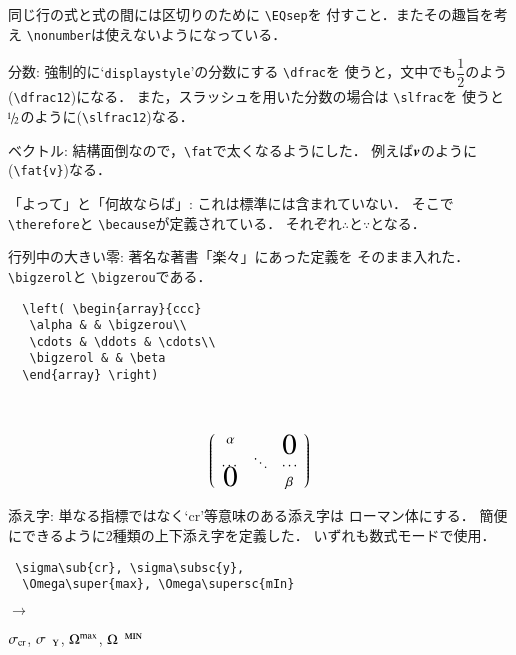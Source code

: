 \documentclass[dvipdfmx,onecolumn]{jsce}  %
\begin{document}
\begin{Description}
\noindent
同じ行の式と式の間には区切りのために \verb+\EQsep+を
付すこと．またその趣旨を考え \verb+\nonumber+は使えないようになっている．
%
\item[分数:] 強制的に`{\tt displaystyle}'の分数にする \verb+\dfrac+を
使うと，文中でも$\dfrac12$のよう(\verb+\dfrac12+)になる．
また，スラッシュを用いた分数の場合は \verb+\slfrac+を
使うと$\slfrac12$のように(\verb+\slfrac12+)なる．
%
\item[ベクトル:] 結構面倒なので，\verb+\fat+で太くなるようにした．
例えば$\mbox{\boldmath{$v$}}$のように(\verb+\fat{v}+)なる．
%
\item[「よって」と「何故ならば」:] これは標準には含まれていない．
そこで \verb+\therefore+と \verb+\because+が定義されている．
それぞれ$\therefore$と$\because$となる．
%
\item[行列中の大きい零:] 著名な著書「楽々\cite{rakuraku}」にあった定義を
そのまま入れた．\verb+\bigzerol+と \verb+\bigzerou+である．
\medskip

\noindent
\mbox{}\hfill
\begin{minipage}[c]{.35\textwidth}
\renewcommand{\baselinestretch}{.75}\small\normalsize
\begin{verbatim}
  \left( \begin{array}{ccc}
   \alpha & & \bigzerou\\
   \cdots & \ddots & \cdots\\
   \bigzerol & & \beta
  \end{array} \right)
\end{verbatim}
\renewcommand{\baselinestretch}{1}\small\normalsize
\end{minipage}
~~~%
\begin{minipage}[c]{.35\textwidth}
\begin{eqnarray*}
\left( \begin{array}{ccc}
 \alpha & & \bigzerou\\
 \cdots & \ddots & \cdots\\
 \bigzerol & & \beta
\end{array} \right)
\end{eqnarray*}
\end{minipage}
\hfill\mbox{}
%
\item[添え字:] 単なる指標ではなく`cr'等意味のある添え字は
ローマン体にする．
簡便にできるように2種類の上下添え字を定義した．
いずれも数式モードで使用．
\medskip

\noindent
\mbox{}\hfill
\begin{minipage}[c]{.45\textwidth}
\renewcommand{\baselinestretch}{0.75}\small\normalsize
\begin{verbatim}
 \sigma\sub{cr}, \sigma\subsc{y},
  \Omega\super{max}, \Omega\supersc{mIn}
\end{verbatim}
\renewcommand{\baselinestretch}{1}\small\normalsize
\end{minipage}
\hfill$\to$\hfill
\begin{minipage}[c]{.3\textwidth}
$\sigma\sub{cr}$, $\sigma\subsc{y}$,
 $\Omega\super{max}$, $\Omega\supersc{mIn}$
\end{minipage}
\hfill\mbox{}
\medskip


\end{Description}
\end{document}
